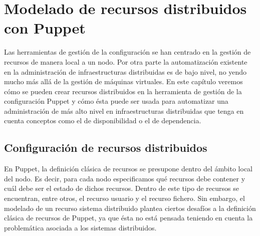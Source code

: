 \chapter{Modelado de recursos distribuidos con Puppet}
\label{cap:modelado}


Las herramientas de gestión de la configuración se han centrado en la gestión de recursos de manera local a un nodo. Por otra parte la automatización existente en la administración de infraestructuras distribuidas es de bajo nivel, no yendo mucho más allá de la gestión de máquinas virtuales. En este capítulo veremos cómo se pueden crear recursos distribuidos en la herramienta de gestión de la configuración Puppet y cómo ésta puede ser usada para automatizar una administración de más alto nivel en infraestructuras distribuidas que tenga en cuenta conceptos como el de disponibilidad o el de dependencia.


\section{Configuración de recursos distribuidos}

En Puppet, la definición clásica de recursos se presupone dentro del ámbito local del nodo. Es decir, para cada nodo especificamos qué recursos debe contener y cuál debe ser el estado de dichos recursos. Dentro de este tipo de recursos se encuentran, entre otros, el recurso usuario y el recurso fichero. Sin embargo, el modelado de un recurso sistema distribuido plantea ciertos desafíos a la definición clásica de recursos de Puppet, ya que ésta no está pensada teniendo en cuenta la problemática asociada a los sistemas distribuidos. \\



